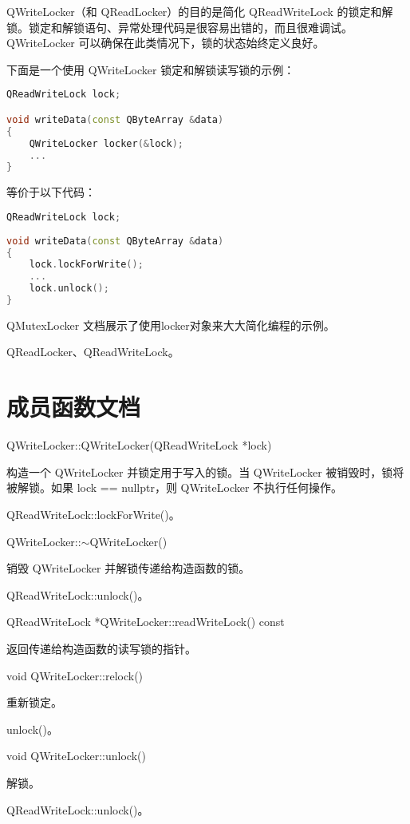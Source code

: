 QWriteLocker（和 QReadLocker）的目的是简化 QReadWriteLock 的锁定和解锁。锁定和解锁语句、异常处理代码是很容易出错的，而且很难调试。QWriteLocker 可以确保在此类情况下，锁的状态始终定义良好。

下面是一个使用 QWriteLocker 锁定和解锁读写锁的示例：


\begin{lstlisting}[language=C++]
QReadWriteLock lock;

void writeData(const QByteArray &data)
{
	QWriteLocker locker(&lock);
	...
}
\end{lstlisting}

等价于以下代码：

\begin{lstlisting}[language=C++]
QReadWriteLock lock;
	
void writeData(const QByteArray &data)
{
	lock.lockForWrite();
	...
	lock.unlock();
}
\end{lstlisting}

QMutexLocker 文档展示了使用locker对象来大大简化编程的示例。

\begin{seeAlso}
QReadLocker、QReadWriteLock。
\end{seeAlso}


\section{成员函数文档}

QWriteLocker::QWriteLocker(QReadWriteLock *lock)


构造一个 QWriteLocker 并锁定用于写入的锁。当 QWriteLocker 被销毁时，锁将被解锁。如果 lock == nullptr，则 QWriteLocker 不执行任何操作。


\begin{seeAlso}
QReadWriteLock::lockForWrite()。
\end{seeAlso}



QWriteLocker::$\sim$QWriteLocker()

销毁 QWriteLocker 并解锁传递给构造函数的锁。

\begin{seeAlso}
QReadWriteLock::unlock()。
\end{seeAlso}

QReadWriteLock *QWriteLocker::readWriteLock() const

返回传递给构造函数的读写锁的指针。

void QWriteLocker::relock()

重新锁定。

\begin{seeAlso}
unlock()。
\end{seeAlso}

void QWriteLocker::unlock()

解锁。

\begin{seeAlso}
QReadWriteLock::unlock()。
\end{seeAlso}



